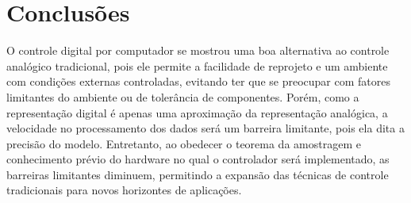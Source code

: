\section{Conclusões}

O controle digital por computador se mostrou uma boa alternativa ao controle analógico tradicional, pois ele permite a facilidade de reprojeto e um ambiente com condições externas controladas, evitando ter que se preocupar com fatores limitantes do ambiente ou de tolerância de componentes. Porém, como a representação digital é apenas uma aproximação da representação analógica, a velocidade no processamento dos dados será um barreira limitante, pois ela dita a precisão do modelo. Entretanto, ao obedecer o teorema da amostragem e conhecimento prévio do hardware no qual o controlador será implementado, as barreiras limitantes diminuem, permitindo a expansão das técnicas de controle tradicionais para novos horizontes de aplicações.
\pagebreak